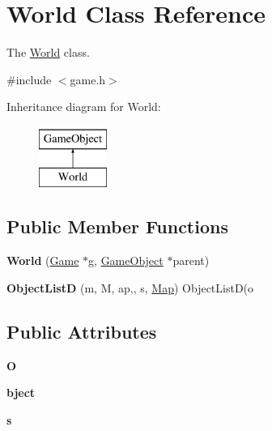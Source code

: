 \hypertarget{class_world}{\section{\-World \-Class \-Reference}
\label{class_world}
}


\-The \hyperlink{class_world}{\-World} class.  




{\ttfamily \#include $<$game.\-h$>$}

\-Inheritance diagram for \-World\-:\begin{figure}[H]
\begin{center}
\leavevmode
\includegraphics[height=2.000000cm]{class_world}
\end{center}
\end{figure}
\subsection*{\-Public \-Member \-Functions}
\begin{DoxyCompactItemize}
\item 
\hypertarget{class_world_a8f2e7de9a7533ed84dbff13b73ab77ef}{{\bfseries \-World} (\hyperlink{class_game}{\-Game} $\ast$g, \hyperlink{class_game_object}{\-Game\-Object} $\ast$parent)}\label{class_world_a8f2e7de9a7533ed84dbff13b73ab77ef}

\item 
\hypertarget{class_world_a7fe6abb143814e0f87145648982f46af}{{\bfseries \-Object\-List\-D} (m, \-M, ap,, s, \hyperlink{class_map}{\-Map}) \-Object\-List\-D(o}\label{class_world_a7fe6abb143814e0f87145648982f46af}

\end{DoxyCompactItemize}
\subsection*{\-Public \-Attributes}
\begin{DoxyCompactItemize}
\item 
\hypertarget{class_world_a180c9e33dc6e59ca8e097bc9e6a36503}{{\bfseries \-O}}\label{class_world_a180c9e33dc6e59ca8e097bc9e6a36503}

\item 
\hypertarget{class_world_a2c3ed57fb27e57a197a2218f196950e2}{{\bfseries bject}}\label{class_world_a2c3ed57fb27e57a197a2218f196950e2}

\item 
\hypertarget{class_world_a985aab8b792338c2a1718f4ec46f88dc}{{\bfseries s}}\label{class_world_a985aab8b792338c2a1718f4ec46f88dc}

\end{DoxyCompactItemize}


